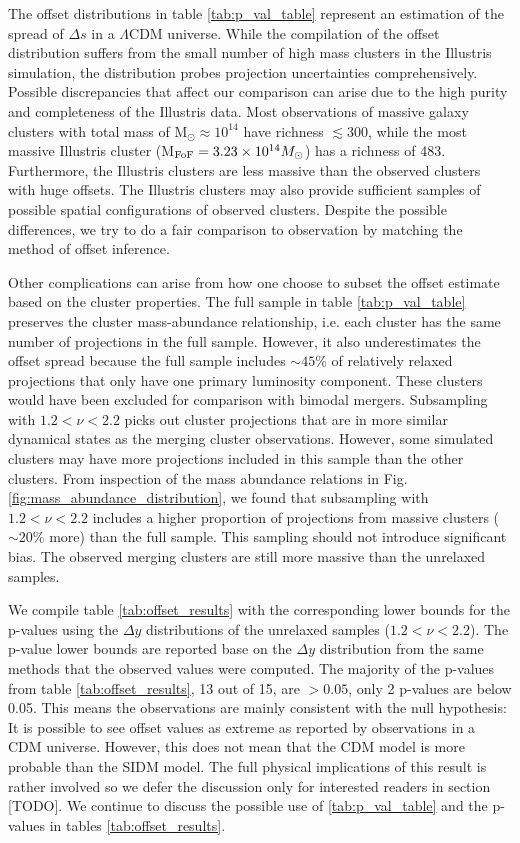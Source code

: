 The offset distributions in table \ref{tab:p_val_table}
represent an estimation of the spread of $\Delta s$ in a $\Lambda$CDM universe.
While the compilation of the offset distribution suffers 
from the small number of high mass clusters in the Illustris simulation, 
the distribution probes projection uncertainties comprehensively. 
Possible discrepancies that affect our comparison can arise
due to the high purity and completeness of the Illustris data.
Most observations of massive galaxy clusters with total mass of M$_\odot
\approx 10^{14}$ have richness $\lesssim 300$, while the most massive Illustris
cluster (M$_{\rm FoF} = 3.23 \times 10^{14} M_\odot$) has a richness of 483.
Furthermore, the Illustris clusters are less massive than the observed clusters
with huge offsets. The Illustris clusters may also provide sufficient samples
of possible spatial configurations of observed clusters.
Despite the possible differences, we try to do a
fair comparison to observation by matching the method of offset inference. 

Other complications can arise from how one choose to subset the offset estimate
based on the cluster properties.
The full sample in table \ref{tab:p_val_table} preserves the cluster mass-abundance
relationship, i.e. each cluster has the same number of projections in
the full sample. However, it also underestimates the offset spread because the
full sample includes $\sim 45\%$ of relatively relaxed projections 
that only have one primary luminosity component.  These clusters would
have been excluded for comparison with bimodal mergers. 
Subsampling with $1.2 < \nu < 2.2$ picks out
cluster projections that are in more similar dynamical states as the merging
cluster observations. 
However, some simulated clusters may have more projections included in this sample
than the other clusters. From inspection of the mass abundance relations in 
Fig. \ref{fig:mass_abundance_distribution}, we found that subsampling with $1.2 <
\nu <2.2$ includes a higher proportion of projections from massive clusters
($\sim 20\%$ more) than 
the full sample. This sampling should not introduce significant bias. 
The observed merging clusters are still more massive than the unrelaxed samples. 

We compile table \ref{tab:offset_results} with the corresponding lower bounds
for the p-values using
the $\Delta y$ distributions of the unrelaxed samples ($1.2 < \nu < 2.2$). 
The p-value lower bounds are reported base on the $\Delta y$ distribution 
from the same methods that the observed values were computed. 
The majority of the p-values from table \ref{tab:offset_results}, 13 out of 15, are
$ > 0.05$, only 2 p-values are below 0.05. 
This means the observations are mainly consistent with the null hypothesis: 
It is possible to see offset values as extreme as reported by observations
in a CDM universe. 
However, this does not mean that the CDM model is more probable than the SIDM model. 
The full physical implications of this result is rather involved so we defer
the discussion only for interested readers in section [TODO]. We continue to 
discuss the possible use of \ref{tab:p_val_table} and
the p-values in tables \ref{tab:offset_results}.

